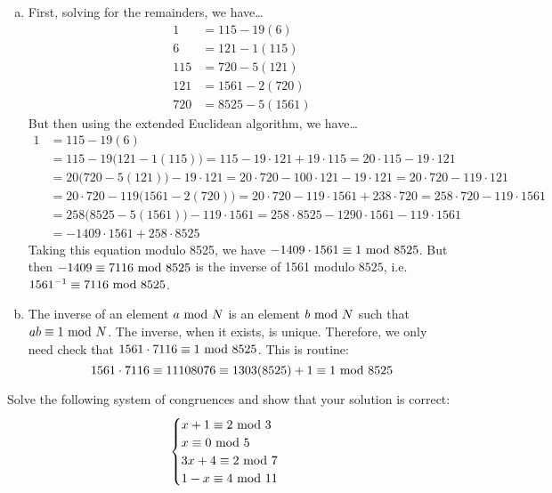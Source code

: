 \documentclass[12pt,letterpaper]{exam}
\begin{document}
\begin{questions}
{\begin{enumerate}[(a)]
\item First, solving for the remainders, we have\dots
	\[
	\begin{aligned}
	1&= 115 - 19(6) \\
	6&= 121 - 1(115) \\
	115&= 720 - 5(121) \\
	121&= 1561 - 2(720) \\
	720&= 8525 - 5(1561)
	\end{aligned}
	\]
But then using the extended Euclidean algorithm, we have\dots
	\[
	\begin{aligned}
	1&= 115 - 19(6) \\
	&= 115 - 19 \big(121 - 1(115) \big)= 115 - 19 \cdot 121 + 19 \cdot 115= 20 \cdot 115 - 19 \cdot 121 \\
	&= 20 \big(720 - 5(121) \big) - 19 \cdot 121= 20 \cdot 720 - 100 \cdot 121 - 19 \cdot 121= 20 \cdot 720 - 119 \cdot 121 \\
	&= 20 \cdot 720 - 119 \big(1561 - 2(720) \big)= 20 \cdot 720 - 119 \cdot 1561 + 238 \cdot 720= 258 \cdot 720 - 119 \cdot 1561 \\
	&= 258 \big(8525 - 5(1561) \big) - 119 \cdot 1561= 258 \cdot 8525 - 1290 \cdot 1561 - 119 \cdot 1561 \\
	&= -1409 \cdot 1561 + 258 \cdot 8525 
	\end{aligned}
	\]
Taking this equation modulo 8525, we have $-1409 \cdot 1561 \equiv 1 \text{ mod } 8525$. But then $-1409 \equiv 7116 \text{ mod } 8525$ is the inverse of 1561 modulo $8525$, i.e. $1561^{-1} \equiv 7116 \text{ mod } 8525$. \pspace

\item The inverse of an element $a \text{ mod } N$ is an element $b \text{ mod } N$ such that $ab \equiv 1 \text{ mod } N$. The inverse, when it exists, is unique. Therefore, we only need check that $1561 \cdot 7116 \equiv 1 \text{ mod } 8525$. This is routine:
	\[
	1561 \cdot 7116 \equiv 11108076 \equiv 1303(8525) + 1 \equiv 1 \text{ mod } 8525
	\]
\end{enumerate}
}



\newpage
\question[10] Solve the following system of congruences and show that your solution is correct:
	\[
	\begin{cases}
	x + 1 \equiv 2 \text{ mod } 3 \\
	x \equiv 0 \text{ mod } 5 \\
	3x + 4 \equiv 2 \text{ mod } 7 \\
	1 - x \equiv 4 \text{ mod } 11
	\end{cases}
	\] \pspace


\end{questions}
\end{document}
